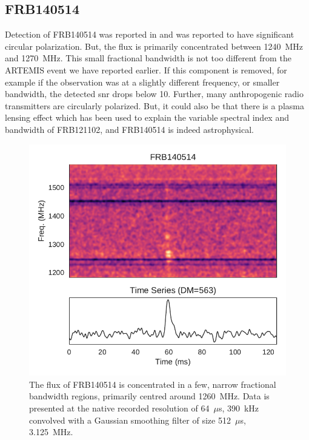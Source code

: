 \documentclass[a4paper,fleqn,usenatbib]{mnras}
\begin{document}
\subsection{FRB140514}

Detection of FRB140514 was reported in \citep{2015MNRAS.447..246P} and was
reported to have significant circular polarization. But, the flux is primarily
concentrated between 1240~MHz and 1270~MHz. This small fractional bandwidth is
not too different from the ARTEMIS event we have reported earlier.  If this
component is removed, for example if the observation was at a slightly different
frequency, or smaller bandwidth, the detected \gls{snr} drops below 10.
Further, many anthropogenic radio transmitters are circularly polarized. But,
it could also be that there is a plasma lensing effect
\citep{2017ApJ...842...35C} which has been used to explain the variable spectral
index and bandwidth of FRB121102, and FRB140514 is indeed astrophysical.

\begin{figure}
    \includegraphics[width=1.0\linewidth]{figures/FRB140514.pdf}
    \caption{The flux of FRB140514 is concentrated in a few, narrow fractional
    bandwidth regions, primarily centred around 1260~MHz.  Data is presented at
    the native recorded resolution of 64~$\mu$s, 390~kHz convolved with a
    Gaussian smoothing filter of size 512~$\mu$s, 3.125~MHz.
    }
    \label{fig:FRB140514}
\end{figure}
\end{document}
